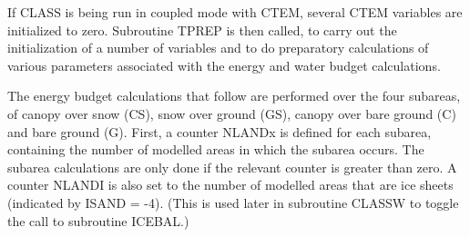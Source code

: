 If C\+L\+A\+S\+S is being run in coupled mode with C\+T\+E\+M, several C\+T\+E\+M variables are initialized to zero. Subroutine T\+P\+R\+E\+P is then called, to carry out the initialization of a number of variables and to do preparatory calculations of various parameters associated with the energy and water budget calculations.

The energy budget calculations that follow are performed over the four subareas, of canopy over snow (C\+S), snow over ground (G\+S), canopy over bare ground (C) and bare ground (G). First, a counter N\+L\+A\+N\+Dx is defined for each subarea, containing the number of modelled areas in which the subarea occurs. The subarea calculations are only done if the relevant counter is greater than zero. A counter N\+L\+A\+N\+D\+I is also set to the number of modelled areas that are ice sheets (indicated by I\+S\+A\+N\+D = -\/4). (This is used later in subroutine C\+L\+A\+S\+S\+W to toggle the call to subroutine I\+C\+E\+B\+A\+L.)

